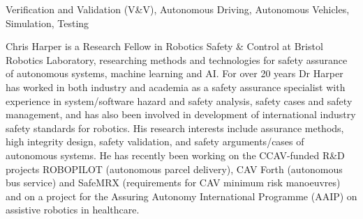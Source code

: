 \documentclass[letterpaper, 10 pt, journal, twoside]{IEEEtran}
\begin{document}
\begin{IEEEkeywords}
Verification and Validation (V\&V), Autonomous Driving, Autonomous Vehicles, Simulation, Testing
\end{IEEEkeywords}
\IEEEpeerreviewmaketitle 




\printbibliography

\begin{IEEEbiography}{Chris Harper}
is a Research Fellow in Robotics Safety \& Control at Bristol Robotics Laboratory, researching methods and technologies for safety assurance of autonomous systems, machine learning and AI. For over 20 years Dr Harper has worked in both industry and academia as a safety assurance specialist with experience in system/software hazard and safety analysis, safety cases and safety management, and has also been involved in development of international industry safety standards for robotics. His research interests include assurance methods, high integrity design, safety validation, and safety arguments/cases of autonomous systems. He has recently been working on the CCAV-funded R\&D projects ROBOPILOT (autonomous parcel delivery), CAV Forth (autonomous bus service) and SafeMRX (requirements for CAV minimum risk manoeuvres) and on a project for the Assuring Autonomy International Programme (AAIP) on assistive robotics in healthcare. 
\end{IEEEbiography}
\end{document}
